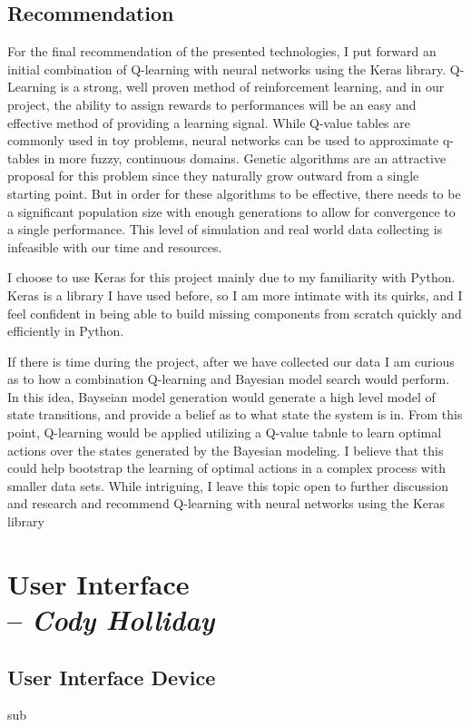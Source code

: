 \documentclass[draftclsnofoot,onecolumn,letterpaper,10pt]{IEEEtran}
\begin{document}
\subsection{Recommendation}
For the final recommendation of the presented technologies, I put forward an initial combination of Q-learning with neural networks using the Keras library.
Q-Learning is a strong, well proven method of reinforcement learning, and in our project, the ability to assign rewards to performances will be an easy and effective method of providing a learning signal.
While Q-value tables are commonly used in toy problems, neural networks can be used to approximate q-tables in more fuzzy, continuous domains.
Genetic algorithms are an attractive proposal for this problem since they naturally grow outward from a single starting point.
But in order for these algorithms to be effective, there needs to be a significant population size with enough generations to allow for convergence to a single performance.
This level of simulation and real world data collecting is infeasible with our time and resources.

I choose to use Keras for this project mainly due to my familiarity with Python. 
Keras is a library I have used before, so I am more intimate with its quirks, and I feel confident in being able to build missing components from scratch quickly and efficiently in Python.

If there is time during the project, after we have collected our data I am curious as to how a combination Q-learning and Bayesian model search would perform.
In this idea, Bayseian model generation would generate a high level model of state transitions, and provide a belief as to what state the system is in.
From this point, Q-learning would be applied utilizing a Q-value tabnle to learn optimal actions over the states generated by the Bayesian modeling.
I believe that this could help bootstrap the learning of optimal actions in a complex process with smaller data sets.
While intriguing, I leave this topic open to further discussion and research and recommend Q-learning with neural networks using the Keras library
\newpage
\section{User Interface \\ -- \textbf{\textit{Cody Holliday}}}
\subsection{User Interface Device}
sub
\end{document}
